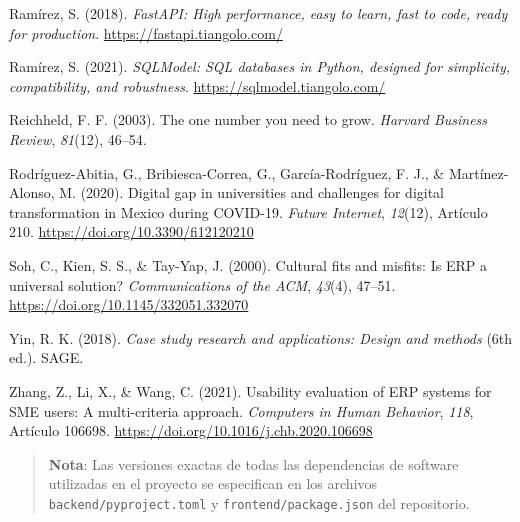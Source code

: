 Ramírez, S. (2018). \emph{FastAPI: High performance, easy to learn, fast to code, ready for production}.
\url{https://fastapi.tiangolo.com/}

Ramírez, S. (2021). \emph{SQLModel: SQL databases in Python, designed for simplicity, compatibility, and
robustness}. \url{https://sqlmodel.tiangolo.com/}

Reichheld, F. F. (2003). The one number you need to grow. \emph{Harvard Business Review}, \emph{81}(12),
46--54.

Rodríguez-Abitia, G., Bribiesca-Correa, G., García-Rodríguez, F. J., \& Martínez-Alonso, M. (2020).
Digital gap in universities and challenges for digital transformation in Mexico during COVID-19.
\emph{Future Internet}, \emph{12}(12), Artículo 210. \url{https://doi.org/10.3390/fi12120210}

Soh, C., Kien, S. S., \& Tay-Yap, J. (2000). Cultural fits and misfits: Is ERP a universal solution?
\emph{Communications of the ACM}, \emph{43}(4), 47--51. \url{https://doi.org/10.1145/332051.332070}

Yin, R. K. (2018). \emph{Case study research and applications: Design and methods} (6th ed.). SAGE.

Zhang, Z., Li, X., \& Wang, C. (2021). Usability evaluation of ERP systems for SME users:
A multi-criteria approach. \emph{Computers in Human Behavior}, \emph{118}, Artículo 106698.
\url{https://doi.org/10.1016/j.chb.2020.106698}

\par\endgroup

\vspace{1em}
\begin{quote}
\textbf{Nota}: Las versiones exactas de todas las dependencias de software utilizadas en el proyecto se especifican en los archivos \texttt{backend/pyproject.toml} y \texttt{frontend/package.json} del repositorio.
\end{quote}
